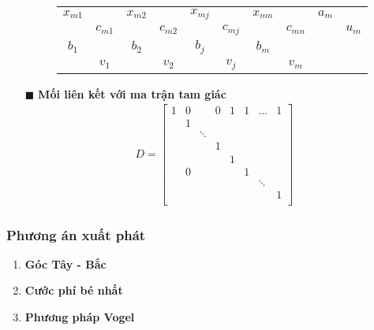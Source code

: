 \documentclass{article}
\begin{document}
\begin{enumerate}
\begin{figure}
\begin{center}
\begin{tabular} { |cc|cc|cc|cc|cc| }
                            \hline
                            $x_{m1}$ && $x_{m2}$ && $x_{mj}$ && $x_{mn}$ && $a_m$ & \\
                            & $c_{m1}$ && $c_{m2}$ && $c_{mj}$ && $c_{mn}$ && $u_m$ \\
                            \hline
                            $b_1$ && $b_2$ && $b_j$ && $b_m$ &&& \\
                            & $v_1$ && $v_2$ && $v_j$ && $v_m$ && \\
                            \hline
                        \end{tabular}
                    \end{center}
                    \end{figure}
        \item[$\blacksquare$] \textbf{Mối liên kết với ma trận tam giác}
                    \begin{align*}
                        D =
                        \begin{bmatrix}
                            1 & 0 && 0 & 1 & 1 & \ldots & 1 \\
                            & 1 &&&&&& \\
                            && \ddots &&&&& \\
                            &&& 1 &&&& \\
                            &&&& 1 &&& \\
                            & 0 &&&& 1 && \\
                            &&&&&& \ddots & \\
                            &&&&&&& 1 \\
                        \end{bmatrix}
                    \end{align*}
            \end{enumerate}
        \subsubsection{Phương án xuất phát}
            \begin{enumerate}
                \item \textbf{Góc Tây - Bắc}
                \item \textbf{Cước phí bé nhất}
                \item \textbf{Phương pháp Vogel}
            \end{enumerate}
\end{document}
